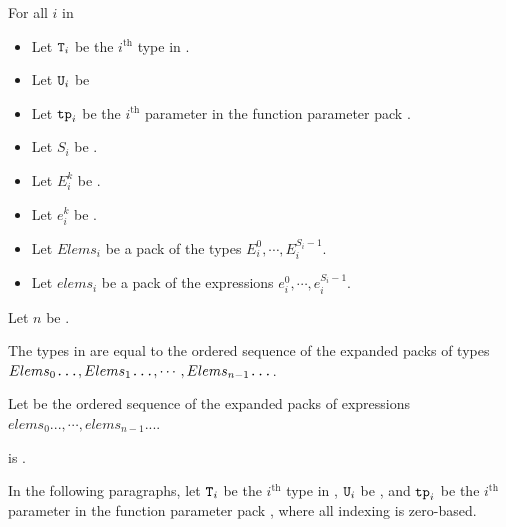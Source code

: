 \documentclass{wg21}
\begin{document}
\begin{itemdescr}  %
    \pnum
    \begin{addedblock}

    For all $i$ in  
        \begin{itemize}
         \item Let $\texttt{T}_i$ be the $i^\text{th}$ type in .
         \item Let $\texttt{U}_i$ be 
         \item Let $\texttt{tp}_i$ be the $i^\text{th}$ parameter in the function parameter pack .
         \item Let $S_i$ be .
         \item Let $E_i^k$ be .
         \item Let $e_i^k$ be .
         \item Let $Elems_i$ be a pack of the types $E_i^0, \cdots,  E_i^{S_i-1}$.
         \item Let $elems_i$ be a pack of the expressions $e_i^0, \cdots,  e_i^{S_i-1}$.
     \end{itemize}

    Let $n$ be .

    The types in  are equal to the ordered
    sequence of the expanded packs of types \\
    $Elems_0\texttt{...} , Elems_1\texttt{...} , \cdots , Elems_{n-1}\texttt{...}$.

    Let  be the ordered sequence of the expanded packs of expressions $elems_0..., \cdots, elems_{n-1}...$.

\mandates {} is .

\returns
    \end{addedblock}
    \begin{removedblock}



    In the following paragraphs, let $\texttt{T}_i$ be the $i^\text{th}$ type in ,
    $\texttt{U}_i$ be , and $\texttt{tp}_i$ be the $i^\text{th}$
    parameter in the function parameter pack , where all indexing is
    zero-based.


\end{removedblock}
\end{itemdescr}
\end{document}
